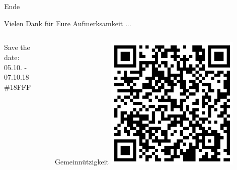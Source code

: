 \documentclass[12pt,hyperref={pdfpagelabels=false},notes=show,aspectratio=169]{beamer}
\begin{document}
\section*{}
\begin{frame}{Ende}
    \begin{center}
        Vielen Dank für Eure Aufmerksamkeit	...

        \vfill

        \begin{columns}
            \begin{column}{0.45\textwidth}
                \center
                Save the date:\\
                05.10. - 07.10.18\\
                \#18FFF
            \end{column}
            \begin{column}{0.45\textwidth}
                \center
                Gemeinnützigkeit
                \includegraphics[width=0.6\textwidth]{img/betterplace}\\
            \end{column}
        \end{columns}
     \end{center}
\end{frame}\addtocounter{framenumber}{-1}
	
\end{document}
